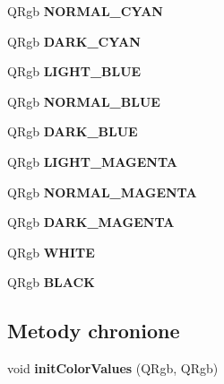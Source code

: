 \begin{CompactItemize}
\item 
\hypertarget{classPColorManager_9b51000ba56bf9a5f0581fd6c9a51ab6}{
QRgb \textbf{NORMAL\_\-CYAN}}
\label{classPColorManager_9b51000ba56bf9a5f0581fd6c9a51ab6}

\item 
\hypertarget{classPColorManager_d7dcde24002d9fa0ee9600d37720a930}{
QRgb \textbf{DARK\_\-CYAN}}
\label{classPColorManager_d7dcde24002d9fa0ee9600d37720a930}

\item 
\hypertarget{classPColorManager_861249c4294f958c0043a1d1b7468435}{
QRgb \textbf{LIGHT\_\-BLUE}}
\label{classPColorManager_861249c4294f958c0043a1d1b7468435}

\item 
\hypertarget{classPColorManager_530893a4eed2d71ce67dff0d500bd0d6}{
QRgb \textbf{NORMAL\_\-BLUE}}
\label{classPColorManager_530893a4eed2d71ce67dff0d500bd0d6}

\item 
\hypertarget{classPColorManager_2d7a0c5c065fa5b662cb53748e5347ed}{
QRgb \textbf{DARK\_\-BLUE}}
\label{classPColorManager_2d7a0c5c065fa5b662cb53748e5347ed}

\item 
\hypertarget{classPColorManager_435503e14622c3bf22d82a4c5ac12884}{
QRgb \textbf{LIGHT\_\-MAGENTA}}
\label{classPColorManager_435503e14622c3bf22d82a4c5ac12884}

\item 
\hypertarget{classPColorManager_28bb798b6307bd6b6bdd59204f3dc131}{
QRgb \textbf{NORMAL\_\-MAGENTA}}
\label{classPColorManager_28bb798b6307bd6b6bdd59204f3dc131}

\item 
\hypertarget{classPColorManager_eabafba23c771c3ad19f67938e11f68b}{
QRgb \textbf{DARK\_\-MAGENTA}}
\label{classPColorManager_eabafba23c771c3ad19f67938e11f68b}

\item 
\hypertarget{classPColorManager_c15cc3f24bec369e9e30fee77ca8899a}{
QRgb \textbf{WHITE}}
\label{classPColorManager_c15cc3f24bec369e9e30fee77ca8899a}

\item 
\hypertarget{classPColorManager_13278cb96706ed743a3f86a6cf4232cb}{
QRgb \textbf{BLACK}}
\label{classPColorManager_13278cb96706ed743a3f86a6cf4232cb}

\end{CompactItemize}
\subsection*{Metody chronione}
\begin{CompactItemize}
\item 
\hypertarget{classPColorManager_2a1ff5037ccab5496ca59c6a636399a7}{
void \textbf{initColorValues} (QRgb, QRgb)}
\label{classPColorManager_2a1ff5037ccab5496ca59c6a636399a7}

\end{CompactItemize}


